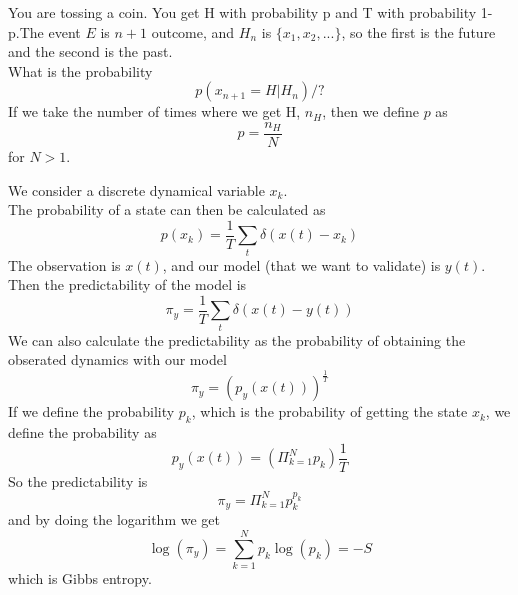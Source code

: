 You are tossing a coin. You get H with probability p and T with probability 1-p.The event $E$ is $n+1$ outcome, and $H_n$ is $\{x_1,x_2,...\}$, so the first is the future and the second is the past. \\
What is the probability
$$
	p(x_{n+1}=H | H_n) / ? %
$$
If we take the number of times where we get H, $n_H$, then we define $p$ as
$$
	p = \frac{n_H}{N}
$$
for $N > 1$.

We consider a discrete dynamical variable $x_k$. \\
The probability of a state can then be calculated as
$$
	p(x_k) = \frac{1}{T}\sum_t \delta(x(t)-x_k)
$$
The observation is $x(t)$, and our model (that we want to validate) is $y(t)$. Then the predictability of the model is
$$
	\pi_y = \frac{1}{T}\sum_t \delta(x(t)-y(t))
$$
We can also calculate the predictability as the probability of obtaining the obserated dynamics with our model
$$
	\pi_y = \left(p_y(x(t))\right)^\frac{1}{T}
$$
If we define the probability $p_k$, which is the probability of getting the state $x_k$, we define the probability as
$$
	p_y(x(t)) = \left(\Pi_{k=1}^N p_k \right)\frac{1}{T}
$$
So the predictability is
$$
	\pi_y = \Pi_{k=1}^N p_k^{p_k}
$$
and by doing the logarithm we get
$$
	\log(\pi_y) = \sum_{k=1}^N p_k\log(p_k) = -S
$$
which is Gibbs entropy.